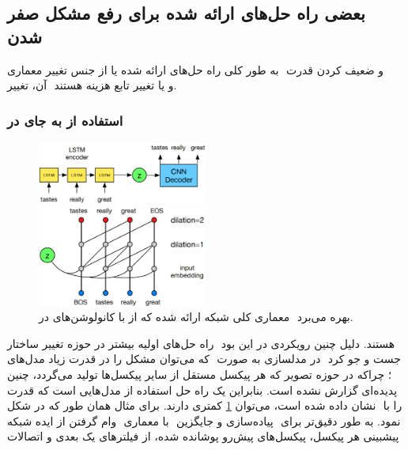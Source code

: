 \subsection{بعضی راه حل‌های ارائه شده برای رفع مشکل صفر شدن }
به طور کلی راه حل‌های ارائه شده یا از جنس تغییر معماری ‎\decoder{}‎ و ضعیف کردن قدرت ‎\autoregressive{}‎ آن، تغییر ‎\priordist{}‎ و یا تغییر تابع هزینه هستند.
\\
\subsubsection{استفاده از \cnn{} به جای \lstm{} در \decoder{}}
\begin{figure}[h]
	\centering
	\includegraphics[width=0.5\textwidth]{images/dialated-conv1.png}

	\vspace{0.5cm}

	\includegraphics[width=0.5\textwidth]{images/dialated-conv2.png}
	\caption{
		معماری کلی شبکه ارائه شده که از \cnn{}  با کانولوشن‌های \dilated{} در  ‎\decoder{}‎ بهره می‌برد.
	}
	\label{fig:dialted_conv}
\end{figure}
راه حل‌های اولیه بیشتر در حوزه تغییر ساختار ‎\decoder{}‎ هستند. دلیل چنین رویکردی در این بود که می‌توان مشکل را در قدرت زیاد مدل‌های ‎\lstm{} در مدلسازی به صورت ‎\autoregressive{}‎ جست و جو کرد \cite{vae_dialated}؛ چراکه در حوزه تصویر که هر پیکسل مستقل از سایر پیکسل‌ها تولید می‌گردد، چنین پدیده‌ای گزارش نشده است. بنابراین یک راه حل استفاده از مدل‌هایی است که قدرت \autoregressive{} کمتری دارند. برای مثال همان طور که در شکل ‎\ref{fig:dialted_conv}‎ نشان داده شده است، می‌توان ‎\decoder{}‎ را با وام گرفتن از ایده شبکه ‎‎ با معماری ‎\cnn{}‎ پیاده‌سازی و جایگزین ‎\lstm{}‎ نمود. به طور دقیق‌تر برای پیشبینی هر پیکسل، پیکسل‌های پیش‌رو پوشانده شده، از فیلتر‌های یک بعدی و اتصالات
